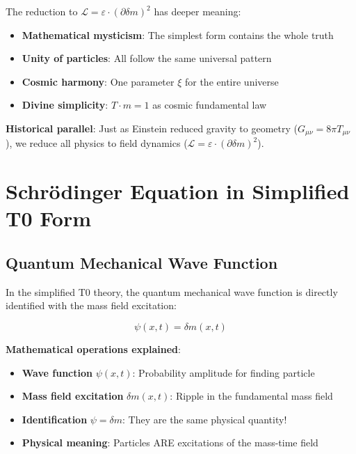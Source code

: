 \documentclass[12pt,a4paper]{article}
\newcommand{\deltam}{\delta m}
\newcommand{\Lag}{\mathcal{L}}
\newcommand{\xipar}{\xi}
\theoremstyle{definition}
\theoremstyle{remark}
\begin{document}
	The reduction to $\Lag = \varepsilon \cdot (\partial \deltam)^2$ has deeper meaning:
	
	\begin{itemize}
		\item \textbf{Mathematical mysticism}: The simplest form contains the whole truth
		\item \textbf{Unity of particles}: All follow the same universal pattern
		\item \textbf{Cosmic harmony}: One parameter $\xipar$ for the entire universe
		\item \textbf{Divine simplicity}: $T \cdot m = 1$ as cosmic fundamental law
	\end{itemize}
	
	\textbf{Historical parallel}: Just as Einstein reduced gravity to geometry ($G_{\mu\nu} = 8\pi T_{\mu\nu}$), we reduce all physics to field dynamics ($\Lag = \varepsilon \cdot (\partial \deltam)^2$).
	
	\section{Schrödinger Equation in Simplified T0 Form}
	
	\subsection{Quantum Mechanical Wave Function}
	
	In the simplified T0 theory, the quantum mechanical wave function is directly identified with the mass field excitation:
	
	\begin{equation}
		\boxed{\psi(x,t) = \deltam(x,t)}
		\label{eq:wavefunction_identification}
	\end{equation}
	
	\textbf{Mathematical operations explained}:
	\begin{itemize}
		\item \textbf{Wave function} $\psi(x,t)$: Probability amplitude for finding particle
		\item \textbf{Mass field excitation} $\deltam(x,t)$: Ripple in the fundamental mass field
		\item \textbf{Identification} $\psi = \deltam$: They are the same physical quantity!
		\item \textbf{Physical meaning}: Particles ARE excitations of the mass-time field
	\end{itemize}
	
\end{document}
